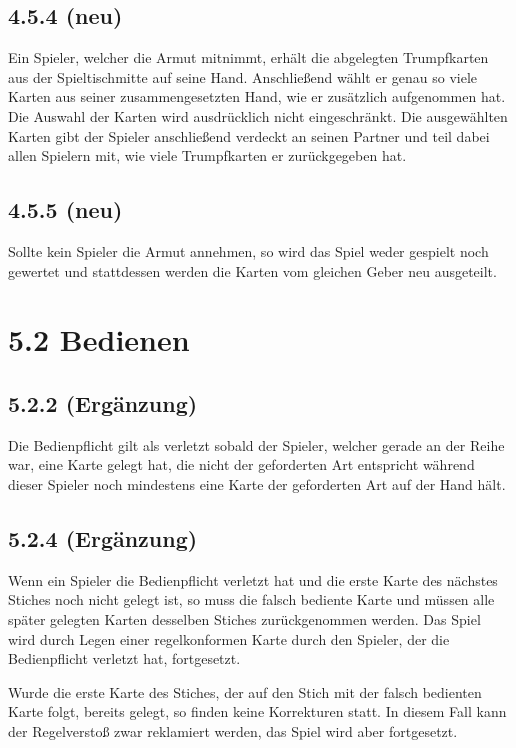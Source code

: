 \subsection*{4.5.4 (neu)}

Ein Spieler, welcher die Armut mitnimmt, erhält die abgelegten
Trumpfkarten aus der Spieltischmitte auf seine Hand. Anschließend
wählt er genau so viele Karten aus seiner zusammengesetzten Hand, wie
er zusätzlich aufgenommen hat. Die Auswahl der Karten wird
ausdrücklich nicht eingeschränkt. Die ausgewählten Karten gibt der
Spieler anschließend verdeckt an seinen Partner und teil dabei allen
Spielern mit, wie viele Trumpfkarten er zurückgegeben hat.

\subsection*{4.5.5 (neu)}

Sollte kein Spieler die Armut annehmen, so wird das Spiel weder gespielt
noch gewertet und stattdessen werden die Karten vom gleichen Geber neu
ausgeteilt.

\section*{5.2 Bedienen}

\subsection*{5.2.2 (Ergänzung)}

Die Bedienpflicht gilt als verletzt sobald der Spieler, welcher gerade an der
Reihe war, eine Karte gelegt hat, die nicht der geforderten Art entspricht
während dieser Spieler noch mindestens eine Karte der geforderten Art auf der
Hand hält.

\subsection*{5.2.4 (Ergänzung)}

Wenn ein Spieler die Bedienpflicht verletzt hat und die erste Karte des nächstes
Stiches noch nicht gelegt ist, so muss die falsch bediente Karte und müssen alle
später gelegten Karten desselben Stiches zurückgenommen werden. Das Spiel wird
durch Legen einer regelkonformen Karte durch den Spieler, der die Bedienpflicht
verletzt hat, fortgesetzt.

Wurde die erste Karte des Stiches, der auf den Stich mit der falsch bedienten
Karte folgt, bereits gelegt, so finden keine Korrekturen statt. In diesem Fall
kann der Regelverstoß zwar reklamiert werden, das Spiel wird aber fortgesetzt.

